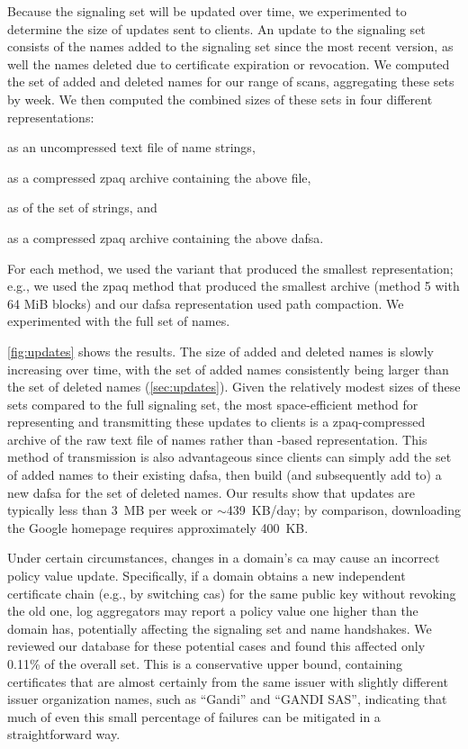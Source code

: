 Because the signaling set will be updated over time, we 
experimented to determine the size of updates sent to clients. An
update to the signaling set consists of the names added to the signaling set
since the most recent version, as well the names deleted due to certificate
expiration or revocation. We computed the set of added and deleted names for our
range of scans, aggregating these sets by week. We then computed the combined
sizes of these sets in four different representations:
\begin{inparaenum}[(1)]
\item as an uncompressed text file of name strings,
\item as a compressed zpaq archive containing the above file,
\item as  of the set of strings, and
\item as a compressed zpaq archive containing the above \ac{dafsa}.
\end{inparaenum}
For each method, we used the variant that produced the smallest representation;
e.g., we used the zpaq method that produced the smallest archive (method
5 with 64 MiB blocks) and our \ac{dafsa} representation used path compaction.
We experimented with the full set of names.

\autoref{fig:updates} shows the results. The size of added and deleted names is
slowly increasing over time, with the set of added names consistently being
larger than the set of deleted names (\autoref{sec:updates}). Given
the relatively modest sizes of these sets compared to the full signaling set,
the most space-efficient method for representing and transmitting these updates
to clients is a zpaq-compressed archive of the raw text file of names rather
than -based representation. This method of transmission is also
advantageous since clients can simply add the set of added names to their
existing \ac{dafsa}, then build (and subsequently add to) a new \ac{dafsa} for
the set of deleted names. Our results show that updates are typically less than
3~MB per week or $\sim$439~KB/day; by comparison, downloading the Google
homepage requires approximately 400~KB.

Under certain circumstances, changes in a domain's \ac{ca} may cause an
incorrect policy value update. Specifically, if a domain obtains a new
independent certificate chain (e.g., by switching \acp{ca}) for the same public
key without revoking the old one, log aggregators may report a policy value one
higher than the domain has, potentially affecting the signaling set and
\ac{name} handshakes. We reviewed our database for these potential cases and
found this affected only 0.11\% of the overall set. This
is a conservative upper bound, containing certificates that are almost certainly
from the same issuer with slightly different issuer organization names, such as
``Gandi'' and ``GANDI SAS'', indicating that much of even this small percentage
of failures can be mitigated in a straightforward way.

